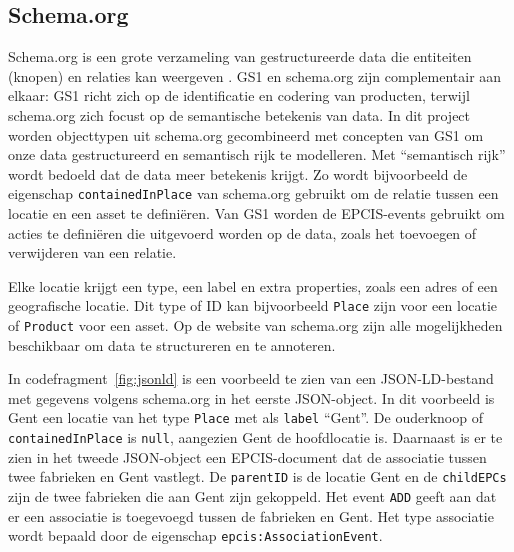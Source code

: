 \subsection{Schema.org}
Schema.org is een grote verzameling van gestructureerde data die entiteiten (knopen) en relaties kan weergeven \autocite{Douglas2023}.
GS1 en schema.org zijn complementair aan elkaar: GS1 richt zich op de identificatie en codering van producten, terwijl schema.org zich focust op de semantische betekenis van data.
In dit project worden objecttypen uit schema.org gecombineerd met concepten van GS1 om onze data gestructureerd en semantisch rijk te modelleren.
Met ``semantisch rijk'' wordt bedoeld dat de data meer betekenis krijgt. Zo wordt bijvoorbeeld de eigenschap \texttt{containedInPlace} van schema.org gebruikt om de relatie tussen een locatie en een asset te definiëren.
Van GS1 worden de EPCIS-events gebruikt om acties te definiëren die uitgevoerd worden op de data, zoals het toevoegen of verwijderen van een relatie.

Elke locatie krijgt een type, een label en extra properties, zoals een adres of een geografische locatie.
Dit type of ID kan bijvoorbeeld \texttt{Place} zijn voor een locatie of \texttt{Product} voor een asset.
Op de website van schema.org zijn alle mogelijkheden beschikbaar om data te structureren en te annoteren.

In codefragment~\ref{fig:jsonld} is een voorbeeld te zien van een JSON-LD-bestand met gegevens volgens schema.org in het eerste JSON-object.
In dit voorbeeld is Gent een locatie van het type \texttt{Place} met als \texttt{label} ``Gent''. De ouderknoop of \texttt{containedInPlace} is \texttt{null}, aangezien Gent de hoofdlocatie is.
Daarnaast is er te zien in het tweede JSON-object een EPCIS-document dat de associatie tussen twee fabrieken en Gent vastlegt.
De \texttt{parentID} is de locatie Gent en de \texttt{childEPCs} zijn de twee fabrieken die aan Gent zijn gekoppeld.
Het event \texttt{ADD} geeft aan dat er een associatie is toegevoegd tussen de fabrieken en Gent.
Het type associatie wordt bepaald door de eigenschap \texttt{epcis:AssociationEvent}.

